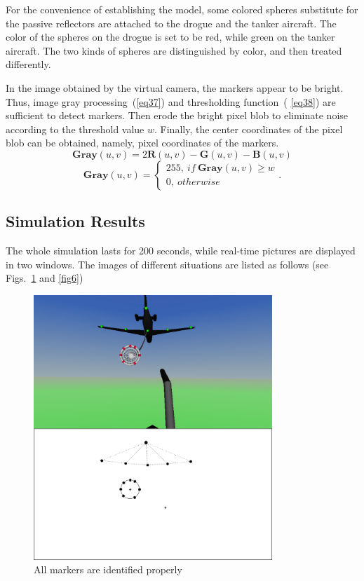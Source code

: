 For the convenience of establishing the model, some colored spheres
substitute for the passive reflectors are attached to the drogue and the
tanker aircraft. The color of the spheres on the drogue is set to be red,
while green on the tanker aircraft. The two kinds of spheres are distinguished
by color, and then treated differently.

In the image obtained by the virtual camera, the markers appear to be
bright. Thus, image gray processing~(\ref{eq37}) and thresholding function~(%
\ref{eq38}) are sufficient to detect markers. Then erode the bright pixel
blob to eliminate noise according to the threshold value $w$. Finally, the center coordinates of the pixel blob
can be obtained, namely, pixel coordinates of the markers. 
\begin{equation}
\mathbf{Gray}(u,v)=2\mathbf{R}(u,v)-\mathbf{G}(u,v)-\mathbf{B}(u,v)  \label{eq37}
\end{equation}
\begin{equation}
\mathbf{Gray}(u,v)=\left\{ 
\begin{array}{l}
255,\ if\ \mathbf{Gray}(u,v)\geq w \\ 
0,\ otherwise
\end{array}
\right.  .\label{eq38}
\end{equation}

\subsection{Simulation Results}

The whole simulation lasts for 200 seconds, while real-time pictures are
displayed in two windows. The images of different situations are listed as
follows (see Figs.~\ref{fig5} and \ref{fig6})

\begin{figure}[!htb]
	\centering
	\includegraphics[width=9cm]{Figures/Figs_Ch6/fangzhen1.eps}
	\caption{All markers are identified properly}
	\label{fig5}
\end{figure}

